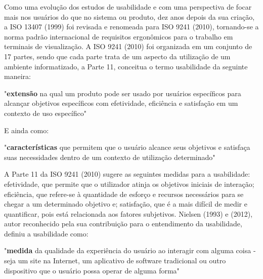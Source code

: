 \indent Como uma evolução dos estudos de usabilidade e com uma perspectiva de focar mais nos usuários do que no sistema ou produto, dez anos depois da sua criação, a  ISO 13407 (1999) foi revisada e renomeada para ISO 9241 (2010), tornando-se a norma padrão internacional de requisitos ergonômicos para o trabalho em terminais de visualização.\newline
\indent A ISO 9241 (2010) foi organizada em um conjunto de 17 partes, sendo que cada parte trata de um aspecto da utilização de um ambiente informatizado, a Parte 11, conceitua o termo usabilidade da seguinte maneira:\newline

{\raggedleft
	\hspace*{4.5cm} 
	\begin{minipage}{0.7\textwidth} 
		"\textbf{extensão} na qual um produto pode ser usado por usuários específicos para alcançar objetivos específicos com efetividade, eficiência e satisfação em um contexto de uso específico" 
		\newline	
	\end{minipage}
	\par}

\indent E ainda como:\newline

	{\raggedleft
	\hspace*{4.5cm} 
	\begin{minipage}{0.7\textwidth} 
		"\textbf{características} que permitem que o usuário alcance seus objetivos e satisfaça suas necessidades dentro de um contexto de utilização determinado" 
		\newline	
	\end{minipage}
	\par}

\indent A Parte 11 da ISO 9241 (2010) sugere as seguintes medidas para a usabilidade: efetividade, que permite que o utilizador atinja os objetivos iniciais de interação; eficiência, que refere-se à quantidade de esforço e recursos necessários para se chegar a um determinado objetivo e; satisfação, que é a mais difícil de medir e quantificar, pois está relacionada aos fatores subjetivos.\newline
\indent Nielsen (1993) e (2012), autor reconhecido pela sua contribuição para o entendimento da usabilidade, definiu a usabilidade como:\newline

	{\raggedleft
	\hspace*{4.5cm} 
	\begin{minipage}{0.7\textwidth} 
		"\textbf{medida} da qualidade da experiência do usuário ao interagir com alguma coisa - seja um site na Internet, um aplicativo de software tradicional ou outro dispositivo que o usuário possa operar de alguma forma" 
		\newline	
	\end{minipage}
	\par}

